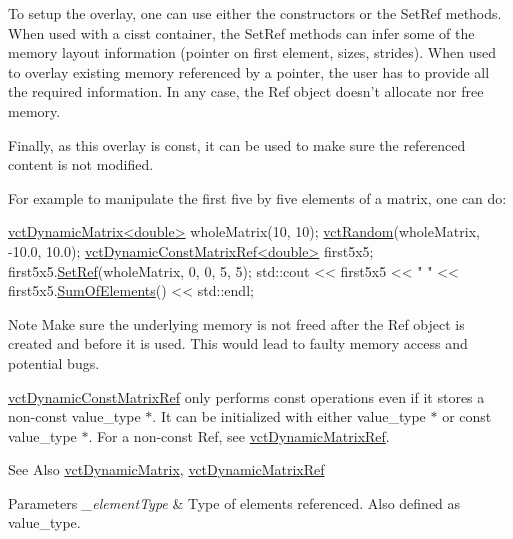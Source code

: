 To setup the overlay, one can use either the constructors or the Set\-Ref methods. When used with a cisst container, the Set\-Ref methods can infer some of the memory layout information (pointer on first element, sizes, strides). When used to overlay existing memory referenced by a pointer, the user has to provide all the required information. In any case, the Ref object doesn't allocate nor free memory.

Finally, as this overlay is const, it can be used to make sure the referenced content is not modified.

For example to manipulate the first five by five elements of a matrix, one can do\-: 
\begin{DoxyCode}
\hyperlink{classvct_dynamic_matrix}{vctDynamicMatrix<double>} wholeMatrix(10, 10);
\hyperlink{group__cisst_vector_ga0d25660a2dc6ef9c093f6f6b2804d2d0}{vctRandom}(wholeMatrix, -10.0, 10.0);
\hyperlink{classvct_dynamic_const_matrix_ref}{vctDynamicConstMatrixRef<double>} first5x5;
first5x5.\hyperlink{classvct_dynamic_const_matrix_ref_a5f4c43a9600e4cf979d3daf0a466443a}{SetRef}(wholeMatrix, 0, 0, 5, 5);
std::cout << first5x5 << \textcolor{stringliteral}{" "} << first5x5.\hyperlink{classvct_dynamic_const_matrix_base_a134c1b6991bafceabe7bb6baa08e05b9}{SumOfElements}() << std::endl;
\end{DoxyCode}


\begin{DoxyNote}{Note}
Make sure the underlying memory is not freed after the Ref object is created and before it is used. This would lead to faulty memory access and potential bugs.

\hyperlink{classvct_dynamic_const_matrix_ref}{vct\-Dynamic\-Const\-Matrix\-Ref} only performs const operations even if it stores a non-\/const {\ttfamily value\-\_\-type $\ast$}. It can be initialized with either {\ttfamily value\-\_\-type $\ast$} or {\ttfamily const value\-\_\-type $\ast$}. For a non-\/const Ref, see \hyperlink{classvct_dynamic_matrix_ref}{vct\-Dynamic\-Matrix\-Ref}.
\end{DoxyNote}
\begin{DoxySeeAlso}{See Also}
\hyperlink{classvct_dynamic_matrix}{vct\-Dynamic\-Matrix}, \hyperlink{classvct_dynamic_matrix_ref}{vct\-Dynamic\-Matrix\-Ref}
\end{DoxySeeAlso}

\begin{DoxyParams}{Parameters}
{\em \-\_\-element\-Type} & Type of elements referenced. Also defined as {\ttfamily value\-\_\-type}. \\
\hline
\end{DoxyParams}


